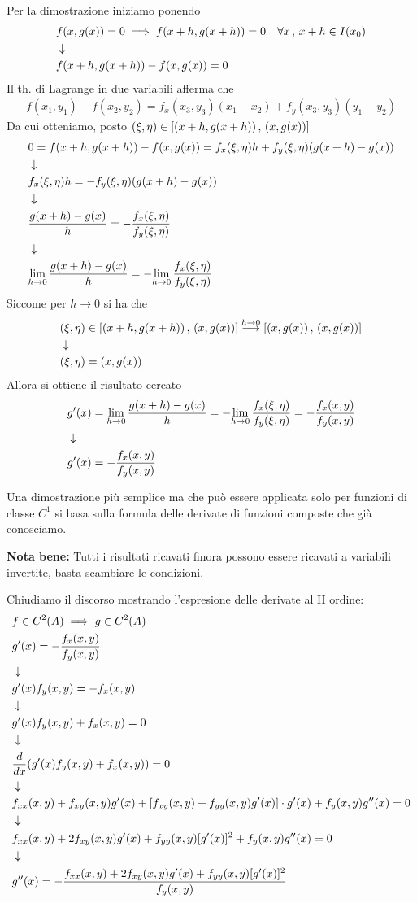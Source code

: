 \bigskip

Per la dimostrazione iniziamo ponendo
\begin{align}
	{}&f(x,g(x))= 0 \implies f(x+h,g(x+h))=0 \quad \forall x \, , \, x+h \in I(x_0) \nonumber \\ &\downarrow \nonumber \\
	&f(x+h,g(x+h)) - f(x,g(x)) = 0
\end{align}
Il th. di Lagrange in due variabili afferma che
\begin{align}
	f(x_1,y_1) - f(x_2,y_2) = f_x(x_3,y_3)(x_1-x_2) + f_y(x_3,y_3)(y_1 - y_2) 
\end{align}
Da cui otteniamo, posto $(\xi,\eta)\in [(x+h,g(x+h)) \, , \, (x,g(x))]$
\begin{align}
	{}&0=f(x+h,g(x+h)) - f(x,g(x)) = f_x(\xi,\eta)h+ f_y(\xi,\eta) (g(x+h) - g(x)) \nonumber \\ &\downarrow \nonumber \\
	&f_x(\xi,\eta)h=  - f_y(\xi,\eta) (g(x+h) - g(x)) \nonumber \\ &\downarrow \nonumber \\
	&\frac{g(x+h) - g(x)}{h} = - \frac{f_x(\xi,\eta)}{f_y(\xi,\eta)} \nonumber \\ &\downarrow \nonumber \\
	&\underset{h \rightarrow 0}{\lim} \, \frac{g(x+h) - g(x)}{h} = - \underset{h \rightarrow 0}{\lim} \, \frac{f_x(\xi,\eta)}{f_y(\xi,\eta)}
\end{align}
Siccome per $h\rightarrow 0$ si ha che
\begin{align}
	{}&(\xi,\eta)\in [(x+h,g(x+h)) \, , \, (x,g(x))] \overset{h \rightarrow 0}{\longrightarrow} [(x,g(x)) \, , \, (x,g(x))] \nonumber \\ &\downarrow \nonumber \\
	&(\xi,\eta) = (x,g(x))
\end{align}
Allora si ottiene il risultato cercato
\begin{align}
	{}&g'(x)=\underset{h \rightarrow 0}{\lim} \, \frac{g(x+h) - g(x)}{h} = - \underset{h \rightarrow 0}{\lim} \, \frac{f_x(\xi,\eta)}{f_y(\xi,\eta)} = - \frac{f_x(x,y)}{f_y(x,y)} \nonumber \\ &\downarrow \nonumber \\
	&g'(x)= - \frac{f_x(x,y)}{f_y(x,y)}
\end{align}

Una dimostrazione più semplice ma che può essere applicata solo per funzioni di classe $C^1$ si basa sulla formula delle derivate di funzioni composte che già conosciamo.

\bigskip

\textbf{Nota bene:} Tutti i risultati ricavati finora possono essere ricavati a variabili invertite, basta scambiare le condizioni.

\bigskip

Chiudiamo il discorso mostrando l'espresione delle derivate al II ordine:
\begin{align}
	{}&f \in C^2(A) \implies g\in C^2(A)\\
	&g'(x) = - \frac{f_x(x,y)}{f_y(x,y)} \nonumber \\ &\downarrow \nonumber \\
	&g'(x)f_y(x,y) = -f_x(x,y) \nonumber \\ &\downarrow \nonumber \\
	& g'(x)f_y(x,y) + f_x(x,y)=0 \nonumber \\ &\downarrow \nonumber \\
	&\frac{d }{d x} (g'(x)f_y(x,y) + f_x(x,y))=0 \nonumber \\ &\downarrow \nonumber \\
	&f_{xx}(x,y) + f_{xy}(x,y)g'(x) + [f_{xy}(x,y) + f_{yy}(x,y)g'(x)]\cdot g'(x) + f_y(x,y)g''(x)=0 \nonumber \\ &\downarrow \nonumber \\
	& f_{xx}(x,y) + 2f_{xy}(x,y)g'(x) + f_{yy}(x,y)[g'(x)]^2 + f_y(x,y)g''(x)=0\nonumber \\ &\downarrow \nonumber \\
	&g''(x) = -\frac{f_{xx}(x,y) + 2f_{xy}(x,y)g'(x) + f_{yy}(x,y)[g'(x)]^2}{f_y(x,y)}
\end{align}

